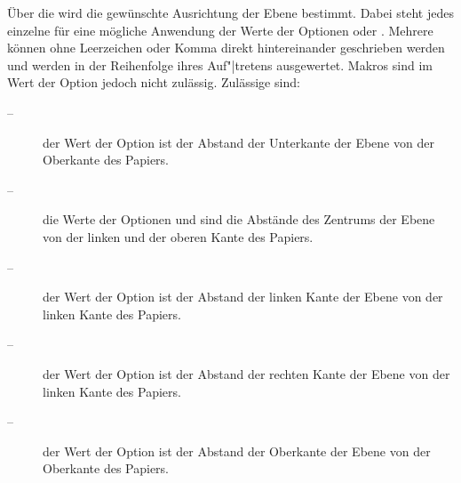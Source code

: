 \begin{desclist}
{    Über die  wird die gewünschte Ausrichtung der
    Ebene bestimmt. Dabei steht jedes einzelne  für
    eine mögliche Anwendung der Werte  der Optionen
     oder . Mehrere
     können ohne Leerzeichen oder Komma direkt
    hintereinander geschrieben werden und werden in der Reihenfolge ihres
    Auf"|tretens ausgewertet. Makros sind im Wert der Option jedoch
    nicht zulässig. Zulässige  sind:
    \begin{description}
    \item[ --] der Wert der Option  ist der Abstand
      der Unterkante der Ebene von der Oberkante des Papiers.
    \item[ --] die Werte der Optionen  und
       sind die Abstände des Zentrums der Ebene von der linken
      und der oberen Kante des Papiers.
    \item[ --] der Wert der Option  ist der Abstand
      der linken Kante der Ebene von der linken Kante des Papiers.
    \item[ --] der Wert der Option  ist der Abstand
      der rechten Kante der Ebene von der linken Kante des Papiers.
    \item[ --] der Wert der Option  ist der Abstand
      der Oberkante der Ebene von der Oberkante des Papiers.
    \end{description}
  }%
\end{desclist}
